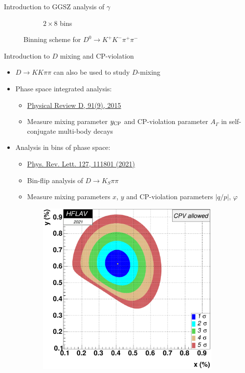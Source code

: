 \documentclass{beamer}
\begin{document}
\begin{frame}{Introduction to GGSZ analysis of $\gamma$}
\begin{figure}
\begin{subfigure}{0.5\textwidth}
      \caption{$2\times 8$ bins}
    \end{subfigure}
    \caption{Binning scheme for $D^0\to K^+K^-\pi^+\pi^-$}
  \end{figure}
\end{frame}

\begin{frame}{Introduction to $D$ mixing and CP-violation}
  \begin{itemize}
    \setlength\itemsep{0.0em}
    \item{$D\to KK\pi\pi$ can also be used to study $D$-mixing}
    \item{Phase space integrated analysis:}
    \begin{itemize}
      \item{\href{https://arxiv.org/abs/1502.04560}{Physical Review D, 91(9), 2015}}
      \item{Measure mixing parameter $y_{\rm CP}$ and CP-violation parameter $A_\Gamma$ in self-conjugate multi-body decays}
    \end{itemize}
    \item{Analysis in bins of phase space:}
    \begin{itemize}
      \item{\href{https://arxiv.org/abs/2106.03744}{Phys. Rev. Lett. 127, 111801 (2021)}}
      \item{Bin-flip analysis of $D\to K_S\pi\pi$}
      \item{Measure mixing parameters $x$, $y$ and CP-violation parameters $|q/p|$, $\varphi$}
    \end{itemize}
  \end{itemize}
  \begin{figure}
    \centering
    \begin{subfigure}{0.35\textwidth}
      \centering
      \includegraphics[width=1.0\textwidth]{Plots/fig_plot_xy2d.pdf}

\end{subfigure}
\end{figure}
\end{frame}
\end{document}
